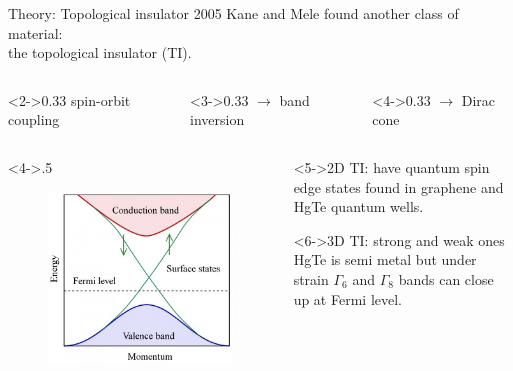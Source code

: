\begin{frame}{Theory: Topological insulator}
	2005 Kane and Mele found another class of material: \\the topological insulator (TI).
	\\
	\begin{columns}
		\begin{column}<2->{0.33\linewidth}
			spin-orbit coupling
		\end{column}
		\hspace{-1cm}
		\begin{column}<3->{0.33\linewidth}
			$\rightarrow$ band inversion
		\end{column}
		\hspace{-1.2cm}
		\begin{column}<4->{0.33\linewidth}
			$\rightarrow$ Dirac cone
		\end{column}
	\end{columns}
	\begin{columns}
		\begin{column}<4->{.5\linewidth}
			\begin{figure}
				\includegraphics[width=\textwidth]{andere_bilder/band_structure_top_insulator}
			\end{figure}
		\end{column}
		\begin{column}{.5\linewidth}
			\begin{block}<5->{2D TI: }
			have quantum spin edge states found in graphene and HgTe quantum wells.
			\end{block}
			\begin{block}<6->{3D TI: }
			strong and weak ones \\
			HgTe is semi metal but under strain $\Gamma_6$ and $\Gamma_8$ bands can close up at Fermi level. 
			\end{block}
		\end{column}
	\end{columns}
	
\end{frame}

